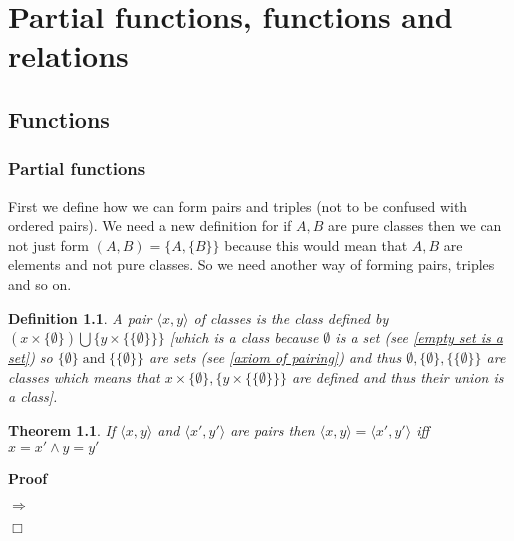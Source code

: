 \documentclass{book}
\newcommand{\tmop}[1]{\ensuremath{\operatorname{#1}}}
\newenvironment{proof}{\noindent\textbf{Proof\ }}{\hspace*{\fill}$\Box$\medskip}
\newtheorem{definition}{Definition}
{\theorembodyfont{\rmfamily}\newtheorem{example}{Example}}
\newtheorem{theorem}{Theorem}
\begin{document}
{{\chapter{Partial functions, functions and relations}

\section{Functions}

\subsection{Partial functions}

First we define how we can form pairs and triples (not to be confused with
ordered pairs). We need a new definition for if $A, B$ are pure classes then
we can not just form $(A, B) = \{ A, \{ B \} \}$ because this would mean that
$A, B$ are elements and not pure classes. So we need another way of forming
pairs, triples and so on.

\begin{definition}
  \label{pair of classes}{}{}A pair $\langle x, y \rangle$ of classes is the class defined by
  $(x \times \{ \emptyset \}) \bigcup \{ y \times \{ \{ \emptyset \} \} \}$
  [which is a class because $\emptyset$ is a set (see \ref{empty set is a
  set}) so $\{ \emptyset \} \tmop{and} \{ \{ \emptyset \} \}$ are sets (see
  \ref{axiom of pairing}) and thus $\emptyset, \{ \emptyset \}, \{ \{
  \emptyset \} \}$ are classes which means that $x \times \{ \emptyset \}, \{
  y \times \{ \{ \emptyset \} \} \}$ are defined and thus their union is a
  class].
\end{definition}

\begin{theorem}
  If $\langle x, y \rangle$ and $\langle x', y' \rangle$ are pairs then
  $\langle x, y \rangle = \langle x', y' \rangle$ iff $x = x' \wedge y = y'$
\end{theorem}

\begin{proof}
  
  
  $\Rightarrow$
  

\end{proof}}}
\end{document}

